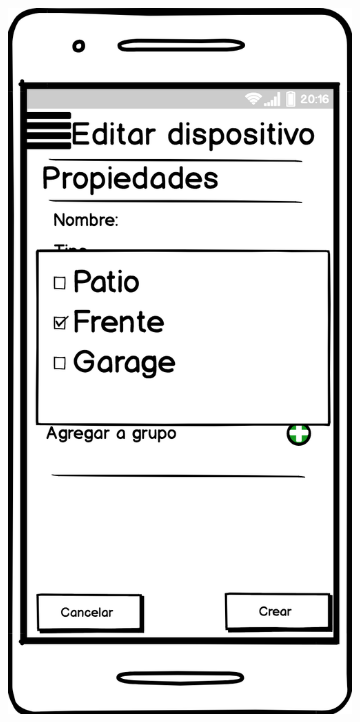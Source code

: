 \begin{figure}[H]
\begin{subfigure}[b]{0.20\textwidth}
    \label{fig:balsamiq}
  \end{subfigure}
  \begin{subfigure}[b]{0.20\textwidth}
    \includegraphics[width=\textwidth, keepaspectratio]{images/balsamiq05}

\end{subfigure}
\end{figure}
